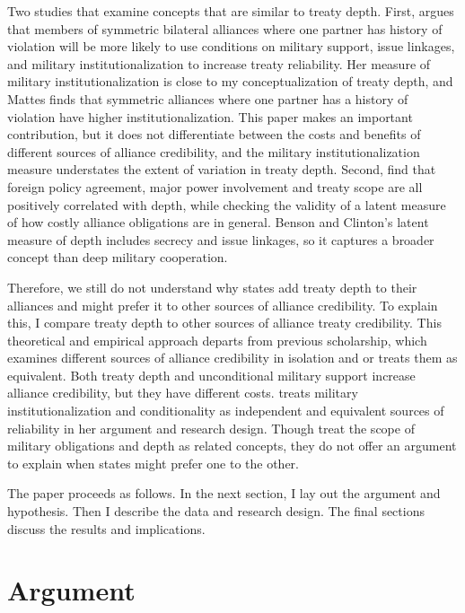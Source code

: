 \documentclass[12pt]{article}
\begin{document}
Two studies that examine concepts that are similar to treaty depth. 
First, \citet{Mattes2012} argues that members of symmetric bilateral alliances where one partner has history of violation will be more likely to use conditions on military support, issue linkages, and military institutionalization to increase treaty reliability. 
Her measure of military institutionalization \citep{LeedsAnac2005} is close to my conceptualization of treaty depth, and Mattes finds that symmetric alliances where one partner has a history of violation have higher institutionalization.
This paper makes an important contribution, but it does not differentiate between the costs and benefits of different sources of alliance credibility, and the military institutionalization measure understates the extent of variation in treaty depth.  
Second, \citet{BensonClinton2016} find that foreign policy agreement, major power involvement and treaty scope are all positively correlated with depth, while checking the validity of a latent measure of how costly alliance obligations are in general. 
Benson and Clinton's latent measure of depth includes secrecy and issue linkages, so it captures a broader concept than deep military cooperation. 


Therefore, we still do not understand why states add treaty depth to their alliances and might prefer it to other sources of alliance credibility. 
To explain this, I compare treaty depth to other sources of alliance treaty credibility. 
This theoretical and empirical approach departs from previous scholarship, which examines different sources of alliance credibility in isolation and or treats them as equivalent. 
Both treaty depth and unconditional military support increase alliance credibility, but they have different costs. 
\citet{Mattes2012} treats military institutionalization and conditionality as independent and equivalent sources of reliability in her argument and research design. 
Though \citet{BensonClinton2016} treat the scope of military obligations and depth as related concepts, they do not offer an argument to explain when states might prefer one to the other. 


The paper proceeds as follows. 
In the next section, I lay out the argument and hypothesis. 
Then I describe the data and research design. 
The final sections discuss the results and implications. 


\section{Argument}
\end{document}
